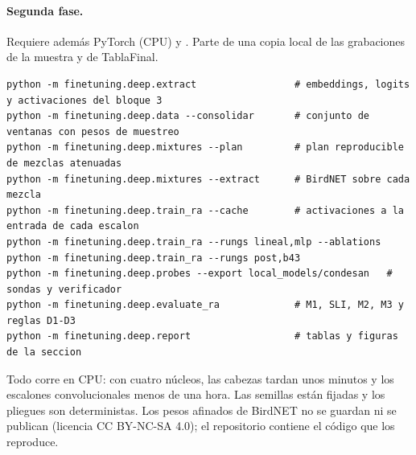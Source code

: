 \documentclass[11pt,a4paper]{article}
\begin{document}
\paragraph{Segunda fase.} Requiere además PyTorch (CPU) y . Parte de una copia local de las grabaciones de la muestra y de TablaFinal.
\begin{lstlisting}
python -m finetuning.deep.extract                 # embeddings, logits y activaciones del bloque 3
python -m finetuning.deep.data --consolidar       # conjunto de ventanas con pesos de muestreo
python -m finetuning.deep.mixtures --plan         # plan reproducible de mezclas atenuadas
python -m finetuning.deep.mixtures --extract      # BirdNET sobre cada mezcla
python -m finetuning.deep.train_ra --cache        # activaciones a la entrada de cada escalon
python -m finetuning.deep.train_ra --rungs lineal,mlp --ablations
python -m finetuning.deep.train_ra --rungs post,b43
python -m finetuning.deep.probes --export local_models/condesan   # sondas y verificador
python -m finetuning.deep.evaluate_ra             # M1, SLI, M2, M3 y reglas D1-D3
python -m finetuning.deep.report                  # tablas y figuras de la seccion
\end{lstlisting}
Todo corre en CPU: con cuatro núcleos, las cabezas tardan unos minutos y los escalones convolucionales menos de una hora. Las semillas están fijadas
y los pliegues son deterministas. Los pesos afinados de BirdNET no se guardan ni se publican (licencia CC BY-NC-SA 4.0); el repositorio contiene el código
que los reproduce.
\end{document}

